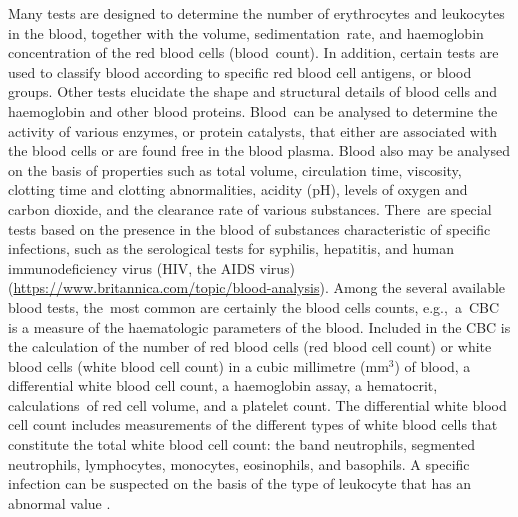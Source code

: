 \documentclass[sensors,review,accept,moreauthors,pdftex,10pt,a4paper]{mdpi}
\begin{document}
Many tests are designed to determine the number of erythrocytes and leukocytes in the blood, together with the volume, sedimentation~rate, and haemoglobin concentration of the red blood cells (blood~count). In addition, certain tests are used to classify blood according to specific red blood cell antigens, or blood groups. Other tests elucidate the shape and structural details of blood cells and haemoglobin and other blood proteins. Blood~can be analysed to determine the activity of various enzymes, or protein catalysts, that either are associated with the blood cells or are found free in the blood plasma.
Blood also may be analysed on the basis of properties such as total volume, circulation time, viscosity, clotting time and clotting abnormalities, acidity (pH), levels of oxygen and carbon dioxide, and the clearance rate of various substances. There~are special tests based on the presence in the blood of substances characteristic of specific infections, such as the serological tests for syphilis, hepatitis, and human immunodeficiency virus (HIV, the AIDS virus) \mbox{(\url{https://www.britannica.com/topic/blood-analysis})}. %
Among the several available blood tests, the~most common are certainly the blood cells counts, \mbox{e.g., a CBC} is a measure of the haematologic parameters of the blood. Included in the CBC is the calculation of the number of red blood cells (red blood cell count) or white blood cells (white blood cell count) in a cubic millimetre (mm$^{3}$) of blood, a differential white blood cell count, a haemoglobin assay, a hematocrit, calculations~of red cell volume, and a platelet count. The differential white blood cell count includes measurements of the different types of white blood cells that constitute the total white blood cell count: the band neutrophils, segmented neutrophils, lymphocytes, monocytes, eosinophils, and basophils. A specific infection can be suspected on the basis of the type of leukocyte that has an abnormal value \cite{DiRuberto2016}.
\end{document}
